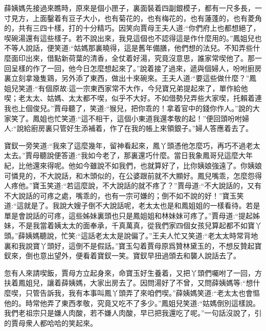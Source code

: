 \begin{parag}
    薛姨媽先接過來瞧時，原來是個小匣子，裏面裝着四副銀模子，都有一尺多長，一寸見方，上面鑿着有豆子大小，也有菊花的，也有梅花的，也有蓮蓬的，也有菱角的，共有三四十樣，打的十分精巧。因笑向賈母王夫人道:“你們府上也都想絕了，喫碗湯還有這些樣子。若不說出來，我見這個也不認得這是作什麼用的。”鳳姐兒也不等人說話，便笑道:“姑媽那裏曉得，這是舊年備膳，他們想的法兒。不知弄些什麼面印出來，借點新荷葉的清香，全仗着好湯，究竟沒意思，誰家常喫他了。那一回呈樣的作了一回，他今日怎麼想起來了。”說着接了過來，遞與個婦人，吩咐廚房裏立刻拿幾隻鶏，另外添了東西，做出十來碗來。王夫人道:“要這些做什麼？”鳳姐兒笑道:“有個原故:這一宗東西家常不大作，今兒寶兄弟提起來了，單作給他喫；老太太、姑媽、太太都不喫，似乎不大好。不如借勢兒弄些大家喫，托賴着連我也上個俊兒。”賈母聽了，笑道:“猴兒，把你乖的！拿着官中的錢你作人。”說的大家笑了。鳳姐也忙笑道:“這不相干，這個小東道我還孝敬的起！”便回頭吩咐婦人:“說給廚房裏只管好生添補着，作了在我的帳上來領銀子。”婦人答應着去了。
\end{parag}


\begin{parag}
    寶釵一旁笑道:“我來了這麼幾年，留神看起來，鳳丫頭憑他怎麼巧，再巧不過老太太去。”賈母聽說便答道:“我如今老了，那裏還巧什麼。當日我象鳳哥兒這麼大年紀，比他還來得呢。他如今雖說不如我們，也就算好了，比你姨娘強遠了。你姨娘可憐見的，不大說話，和木頭似的，在公婆跟前就不大顯好。鳳兒嘴乖，怎麼怨得人疼他。”寶玉笑道:“若這麼說，不大說話的就不疼了？”賈母道:“不大說話的，又有不大說話的可疼之處，嘴乖的，也有一宗可嫌的；倒不如不說的好！”寶玉笑道:“這就是了。我說大嫂子倒不大說話呢，老太太也是和鳳姐姐的一樣看待。若是單是會說話的可疼，這些姊妹裏頭也只是鳳姐姐和林妹妹可疼了。”賈母道:“提起姊妹，不是我當着姨太太的面奉承，千真萬真，從我們家四個女孩兒算起都不如寶丫頭。”薛姨媽聽說，忙笑:“這話老太太是說偏了。”王夫人忙又笑道:“老太太時常背地裏和我說寶丫頭好，這倒不是假話。”寶玉勾着賈母原爲贊林黛玉的，不想反贊起寶釵來，倒也意出望外，便看着寶釵一笑。寶釵早扭過頭去和襲人說話去了。
\end{parag}


\begin{parag}
    忽有人來請喫飯，賈母方立起身來，命寶玉好生養着，又把丫頭們囑咐了一回，方扶着鳳姐兒，讓着薛姨媽，大家出房去了。因問湯好了不曾，又問薛姨媽等:“想什麼喫，只管告訴我，我有本事叫鳳丫頭弄了來咱們喫。”薛姨媽笑道:“老太太也會慪他的。時常他弄了東西孝敬，究竟又吃不了多少。”鳳姐兒笑道:“姑媽倒別這樣說。我們老祖宗只是嫌人肉酸，若不嫌人肉酸，早已把我還吃了呢。”一句話沒說了，引的賈母衆人都哈哈的笑起來。
\end{parag}


